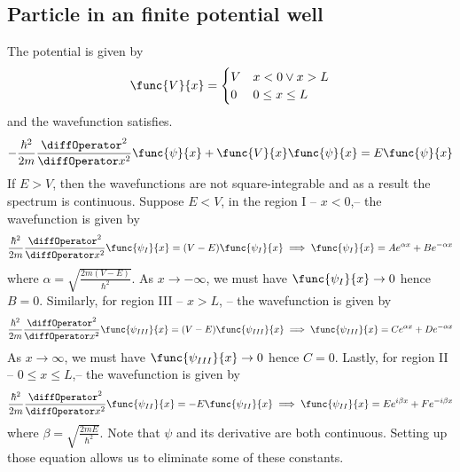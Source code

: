 \subsection{Particle in an finite potential well}
The potential is given by
\begin{equation*}
    \func{V}{x} = \begin{cases}
        V & x < 0 \lor x > L \\
        0 & 0 \leq x \leq L
    \end{cases}
\end{equation*}
and the wavefunction satisfies.
\begin{equation*}
    -\frac{\hbar^2}{2m} \dfrac{\diffOperator^2}{\diffOperator x^2} \func{\psi}{x} + \func{V}{x}\func{\psi}{x}= E \func{\psi}{x}
\end{equation*}
If \(E > V\), then the wavefunctions are not square-integrable and as a result the spectrum is continuous. Suppose \(E < V\), in the region I -- \(x < 0\),-- the wavefunction is given by 
\begin{equation*}
    \frac{\hbar^2}{2m} \dfrac{\diffOperator^2}{\diffOperator x^2} \func{\psi_I}{x} = (V - E)\func{\psi_I}{x} \implies \func{\psi_I}{x} = A e^{\alpha x} + B e^{- \alpha x}
\end{equation*}
where \(\alpha=  \sqrt{\frac{2m(V - E)}{\hbar^2}}\). As \(x \to -\infty\), we must have \(\func{\psi_I}{x} \to 0\) hence \(B = 0\). Similarly, for region III -- \(x > L\), -- the wavefunction is given by 
\begin{equation*}
    \frac{\hbar^2}{2m} \dfrac{\diffOperator^2}{\diffOperator x^2} \func{\psi_{III}}{x} = (V - E)\func{\psi_{III}}{x} \implies \func{\psi_{III}}{x} = C e^{\alpha x} + D e^{- \alpha x}
\end{equation*}
As \(x \to \infty\), we must have \(\func{\psi_{III}}{x} \to 0\) hence \(C = 0\). Lastly, for region II -- \(0 \leq x \leq L\),-- the wavefunction is given by 
\begin{equation*}
    \frac{\hbar^2}{2m} \dfrac{\diffOperator^2}{\diffOperator x^2} \func{\psi_{II}}{x} = -E\func{\psi_{II}}{x} \implies \func{\psi_{II}}{x} = E e^{i\beta x} + F e^{- i\beta x}
\end{equation*}
where \(\beta = \sqrt{\frac{2mE}{\hbar^2}}\). Note that \(\psi\) and its derivative are both continuous. Setting up those equation allows us to eliminate some of these constants. 
